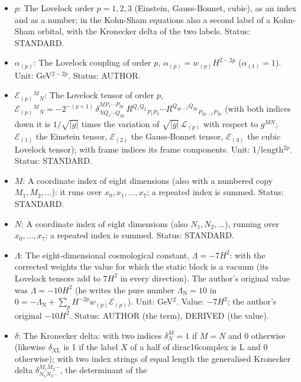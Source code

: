 \documentclass[
  10pt,
]{article}
\providecommand{\tightlist}{%
  \setlength{\itemsep}{0pt}\setlength{\parskip}{0pt}}
\begin{document}
\begin{itemize}
\tightlist
\item
  \(p\): The Lovelock order \(p = 1, 2, 3\) (Einstein, Gauss-Bonnet,
  cubic), as an index and as a number; in the Kohn-Sham equations also a
  second label of a Kohn-Sham orbital, with the Kronecker delta of the
  two labels. Status: STANDARD.
\item
  \(\alpha_{(p)}\): The Lovelock coupling of order \(p\),
  \(\alpha_{(p)} = w_{(p)}H^{2-2p}\) (\(\alpha_{(1)} = 1\)). Unit:
  GeV\(^{2-2p}\). Status: AUTHOR.
\item
  \(\mathcal{E}_{(p)}{}^M{}_N\): The Lovelock tensor of order \(p\),
  \(\mathcal{E}_{(p)}{}^M{}_N = -2^{-(p+1)}\,\delta^{MP_1\cdots P_{2p}}_{NQ_1\cdots Q_{2p}}\,R^{Q_1Q_2}{}_{P_1P_2}\cdots R^{Q_{2p-1}Q_{2p}}{}_{P_{2p-1}P_{2p}}\)
  (with both indices down it is \(1/\sqrt{\lvert g\rvert}\) times the
  variation of \(\sqrt{\lvert g\rvert}\,\mathcal{L}_{(p)}\) with respect
  to \(g^{MN}\); \(\mathcal{E}_{(1)}\) the Einstein tensor,
  \(\mathcal{E}_{(2)}\) the Gauss-Bonnet tensor, \(\mathcal{E}_{(3)}\)
  the cubic Lovelock tensor); with frame indices its frame components.
  Unit: 1/length\(^{2p}\). Status: STANDARD.
\item
  \(M\): A coordinate index of eight dimensions (also with a numbered
  copy \(M_1, M_2, \dots\)): it runs over \(x_0, x_1, \dots, x_7\); a
  repeated index is summed. Status: STANDARD.
\item
  \(N\): A coordinate index of eight dimensions (also
  \(N_1, N_2, \dots\)), running over \(x_0, \dots, x_7\); a repeated
  index is summed. Status: STANDARD.
\item
  \(\Lambda\): The eight-dimensional cosmological constant,
  \(\Lambda = -7H^2\): with the corrected weights the value for which
  the static block is a vacuum (its Lovelock tensors add to \(7H^2\) in
  every direction). The author's original value was \(\Lambda = -10H^2\)
  (he writes the pure number \(\Lambda_{\mathrm{N}} = 10\) in
  \(0 = -\Lambda_{\mathrm{N}} + \sum_p H^{-2p}w_{(p)}\mathcal{E}_{(p)}\)).
  Unit: GeV\(^2\). Value: \(-7H^2\); the author's original \(-10H^2\).
  Status: AUTHOR (the term), DERIVED (the value).
\item
  \(\delta\): The Kronecker delta: with two indices \(\delta^M_N = 1\)
  if \(M = N\) and 0 otherwise (likewise \(\delta_{X\mathrm{L}}\) is 1
  if the label \(X\) of a half of dirac16complex is L and 0 otherwise);
  with two index strings of equal length the generalised Kronecker delta
  \(\delta^{M_1M_2\cdots}_{N_1N_2\cdots}\), the determinant of the

\end{itemize}
\end{document}
